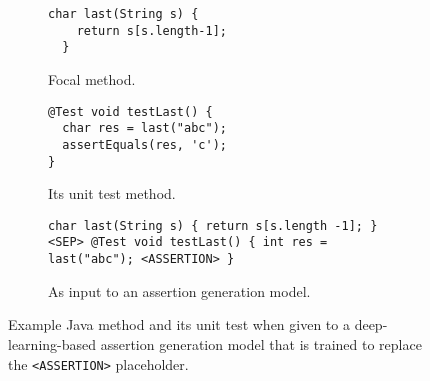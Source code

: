 
\begin{figure}[t]
  \begin{subfigure}{0.45\linewidth}
    \centering%
    \begin{lstlisting}[aboveskip=0pt,belowskip=0pt]
  char last(String s) {
    return s[s.length-1];
  }
    \end{lstlisting}
    \caption{%
      Focal method.
    }\label{fig:intro-example-focal-method}
  \end{subfigure}
  \hfill%
  \begin{subfigure}{0.45\linewidth}
    \centering%
    \begin{lstlisting}[aboveskip=0pt,belowskip=0pt]
@Test void testLast() {
  char res = last("abc");
  assertEquals(res, 'c');
}
    \end{lstlisting}
    \caption{%
      Its unit test method.
    }\label{fig:intro-example-test}
  \end{subfigure}
  \hfill%
  \begin{subfigure}{1.0\linewidth}
    \begin{lstlisting}[breakindent=0pt,breakautoindent=false,belowskip=0pt]
char last(String s) { return s[s.length -1]; } <SEP> @Test void testLast() { int res = last("abc"); <ASSERTION> }
    \end{lstlisting}
    \caption{As input to an assertion generation model.}\label{fig:intro-example-input}
  \end{subfigure}
  \caption{%
    Example Java method and its unit test when given to a deep-learning-based assertion generation model that is trained to replace the \texttt{<ASSERTION>} placeholder.
  }\label{fig:example-assertion-generation}
\end{figure}
